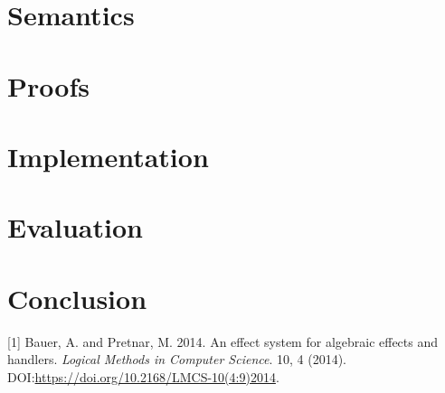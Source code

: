 \documentclass[master=cws,masteroption=ai, english]{kulemt}
\begin{document}
\chapter{Semantics}\label{semantics}

\chapter{Proofs}\label{proofs}

\chapter{Implementation}\label{implementation}

\chapter{Evaluation}\label{evaluation}

\chapter*{Conclusion}\label{conclusion}

\hypertarget{refs}{}
\hypertarget{ref-effectsystem}{}
{[}1{]} Bauer, A. and Pretnar, M. 2014. An effect system for algebraic
effects and handlers. \emph{Logical Methods in Computer Science}. 10, 4
(2014). DOI:\url{https://doi.org/10.2168/LMCS-10(4:9)2014}.

\backmatter



\end{document}
